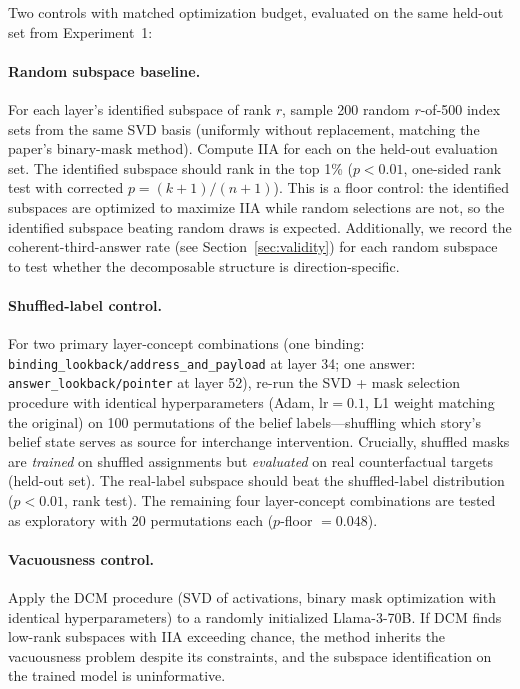 \documentclass{article}
\begin{document}
Two controls with matched optimization budget, evaluated on the same held-out set from Experiment~1:

\paragraph{Random subspace baseline.} For each layer's identified subspace of rank $r$, sample 200 random $r$-of-500 index sets from the same SVD basis (uniformly without replacement, matching the paper's binary-mask method). Compute IIA for each on the held-out evaluation set. The identified subspace should rank in the top 1\% ($p < 0.01$, one-sided rank test with corrected $p = (k + 1)/(n + 1)$). This is a floor control: the identified subspaces are optimized to maximize IIA while random selections are not, so the identified subspace beating random draws is expected. Additionally, we record the coherent-third-answer rate (see Section~\ref{sec:validity}) for each random subspace to test whether the decomposable structure is direction-specific.

\paragraph{Shuffled-label control.} For two primary layer-concept combinations (one binding: \texttt{binding\_lookback/address\_and\_payload} at layer 34; one answer: \texttt{answer\_lookback/pointer} at layer 52), re-run the SVD + mask selection procedure with identical hyperparameters (Adam, $\text{lr} = 0.1$, L1 weight matching the original) on 100 permutations of the belief labels---shuffling which story's belief state serves as source for interchange intervention. Crucially, shuffled masks are \emph{trained} on shuffled assignments but \emph{evaluated} on real counterfactual targets (held-out set). The real-label subspace should beat the shuffled-label distribution ($p < 0.01$, rank test). The remaining four layer-concept combinations are tested as exploratory with 20 permutations each ($p$-floor $= 0.048$).

\paragraph{Vacuousness control.} Apply the DCM procedure (SVD of activations, binary mask optimization with identical hyperparameters) to a randomly initialized Llama-3-70B. If DCM finds low-rank subspaces with IIA exceeding chance, the method inherits the \citet{sutter2025vacuous} vacuousness problem despite its constraints, and the subspace identification on the trained model is uninformative.
\end{document}

